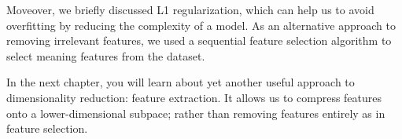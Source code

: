 \documentclass[11pt]{article}
\begin{document}
Moveover, we briefly discussed L1 regularization, which can help us to
avoid overfitting by reducing the complexity of a model. As an
alternative approach to removing irrelevant features, we used a
sequential feature selection algorithm to select meaning features from
the dataset.

In the next chapter, you will learn about yet another useful approach to
dimensionality reduction: feature extraction. It allows us to compress
features onto a lower-dimensional subpace; rather than removing features
entirely as in feature selection.


    
    
    
    
\end{document}
